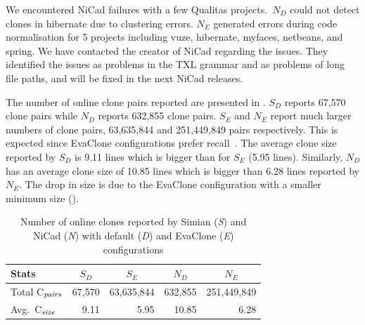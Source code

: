 \documentclass[sigconf,review, anonymous]{acmart}
\begin{document}
We encountered NiCad failures with a few Qualitas projects.~$N_D$
could not detect clones in \textsf{hibernate} due to clustering
errors. $N_E$ generated errors during code normalisation for 5
projects including \textsf{vuze}, \textsf{hibernate},
\textsf{myfaces}, \textsf{netbeans}, and \textsf{spring}. We have
contacted the creator of NiCad regarding the issues. They identified
the issues as problems in the TXL grammar and as problems of long file
paths, and will be fixed in the next NiCad releases.

The number of online clone pairs reported %
are presented in . $S_D$ reports 67,570 clone
pairs while $N_D$ reports 632,855 clone pairs. $S_E$ and $N_E$ report
much larger numbers of clone pairs, 63,635,844 and 251,449,849 pairs
respectively. This is expected since EvaClone configurations prefer
recall~\cite{Wang2013}.  The average clone size reported by $S_D$ is
9.11 lines which is bigger than for $S_E$ (5.95 lines). Similarly,
$N_D$ has an average clone size of 10.85 lines which is bigger than
6.28 lines reported by $N_E$. The drop in size is due to the EvaClone
configuration with a smaller minimum size ().

\begin{table}
	\centering
	\caption{Number of online clones reported by Simian (\textit{S}) and NiCad (\textit{N}) with default (\textit{D}) and EvaClone (\textit{E}) configurations}
	\label{tab:orig_stats}
	\begin{tabular}{l|r|r|r|r}
		\hline
		Stats & \multicolumn{1}{c|}{$S_D$} & \multicolumn{1}{c|}{$S_E$} & \multicolumn{1}{c|}{$N_D$} & \multicolumn{1}{c}{$N_E$} \\
		\hline
		Total C$_{\textrm{\textit{pairs}}}$ & 67,570 & 63,635,844 & 632,855 & 251,449,849 \\
		Avg.~C$_{\textrm{\textit{size}}}$ & 9.11 & 5.95 & 10.85 & 6.28 \\
		\hline
	\end{tabular} %
\end{table}
\end{document}
